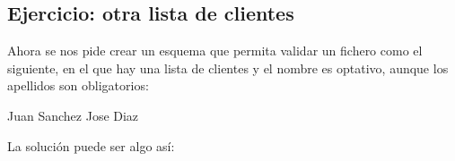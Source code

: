 \documentclass[letterpaper,10pt,spanish]{sphinxmanual}
\begin{document}
\subsection{Ejercicio: otra lista de clientes}
\label{\detokenize{tema5:ejercicio-otra-lista-de-clientes}}
Ahora se nos pide crear un esquema que permita validar un fichero como el siguiente, en el que hay una lista de clientes y el nombre es optativo, aunque los apellidos son obligatorios:

\begin{sphinxVerbatim}[commandchars=\\\{\}]
    Juan
    Sanchez
    Jose
    Diaz
\end{sphinxVerbatim}

La solución puede ser algo así:
\end{document}
